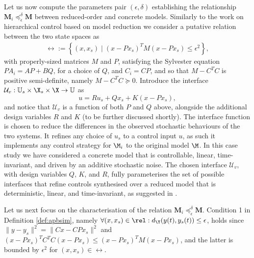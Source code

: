 \documentclass[letterpaper, 10 pt, conference]{amsart}
\theoremstyle{definition}
\theoremstyle{example}
\theoremstyle{remark}
\newcommand{\InF}{\mathcal{U}_{v}}
\begin{document}
Let us now compute the parameters pair $(\epsilon,\delta)$ establishing the relationship $\mathbf M_i\preceq_\epsilon^\delta \mathbf M$ between reduced-order and concrete models.  
Similarly to the work \cite{Girard2009} on hierarchical control based on model reduction we consider a putative relation between the two state spaces as 
 \begin{align*}
 \rel :=\left\{ (x,x_s)\mid 
 (x-Px_s)^T M (x-Px_s)\leq \epsilon^2
 \right\}, 
 \end{align*}
with properly-sized matrices $M$ and $P$, 
satisfying the Sylvester equation $P A_i = AP+ BQ$, for a choice of $Q$, 
and $C_i=CP$, 
and so that $M-C^TC$ is positive semi-definite, namely $M-C^TC\succeq0$. 
Introduce the interface $\InF:\mathbb U_s\times \X_s\times \X\rightarrow \mathbb U$ as 
\[u=R u_s+Qx_s+K(x-Px_s),\] 
and notice that $\InF$ is a function of both $P$ and $Q$ above, 
alongside the additional design variables $R$ and $K$ (to be further discussed shortly).   
The interface function is chosen to reduce the differences in the observed stochastic behaviours of the two systems.  
It refines any choice of $u_s$ to a control input $u$, as such it implements any control strategy for $\M_i$ to the original model $\M$. 
In this case study we have considered a concrete model that is controllable, linear, time-invariant, and driven by an additive stochastic noise.  
The chosen interface $\InF$, with design variables $Q$, $K$, and $R$, 
fully parameterises the set of possible interfaces that refine controls synthesised over a reduced model that is deterministic, linear, and time-invariant, as suggested in \cite{Girard2009}. 


Let us next focus on the characterisation of the relation $\mathbf M_i\preceq_\epsilon^\delta \mathbf M$. 
\noindent Condition 1 in Definition \ref{def:apbsim}, namely 
$\forall (x,x_s)\in \rel: d_\Y(y(t),y_s(t))\leq \epsilon$, 
holds since $\|y-y_s\|^2=\|Cx-C Px_s\|^2$ and $(x-Px_s)^TC^TC(x-Px_s)\leq  (x-Px_s)^TM(x-Px_s)$, 
and the latter is bounded by $\epsilon^2$ for $(x,x_s)\in \rel$.  
\end{document}
